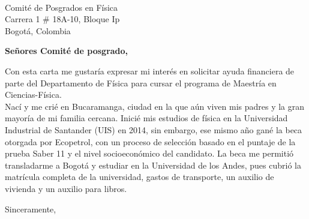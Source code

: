 \documentclass[10pt]{letter} %
\begin{document}

\begin{letter}{\\ Comité de Posgrados en Física \\ Carrera 1 \# 18A-10, Bloque Ip \\ Bogotá, Colombia} %


\opening{\textbf{Señores Comité de posgrado,}}
Con esta carta me gustaría expresar mi interés en solicitar ayuda financiera de parte del Departamento de Física para cursar el programa de Maestría en Ciencias-Física.\\
Nací y me crié en Bucaramanga, ciudad en la que aún viven mis padres y la gran mayoría de mi familia cercana. Inicié mis estudios de física en la Universidad Industrial de Santander (UIS) en 2014, sin embargo, ese mismo año gané la beca  otorgada por Ecopetrol, con un proceso de selección basado en el puntaje de la prueba Saber 11 y el nivel socioeconómico del candidato. La beca me permitió transladarme a Bogotá y estudiar en la Universidad de los Andes, pues cubrió la matrícula completa de la universidad, gastos de transporte, un auxilio de vivienda y un auxilio para libros. %




\vspace{2\parskip} %
\closing{Sinceramente,}
\vspace{2\parskip} %



\end{letter}
 
\end{document}
